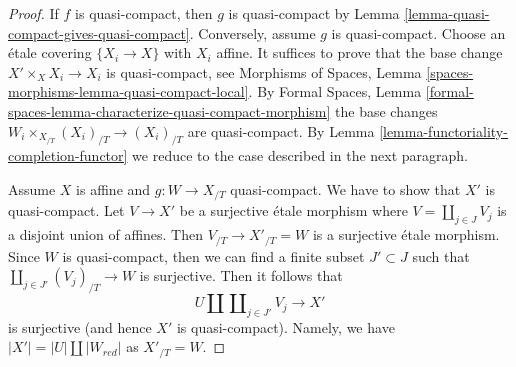\documentclass[10pt,a4paper]{amsart}
\theoremstyle{plain}
\theoremstyle{definition}
\theoremstyle{remark}
\numberwithin{equation}{subsection}
\begin{document}
\begin{proof}
If $f$ is quasi-compact, then $g$ is quasi-compact by
Lemma \ref{lemma-quasi-compact-gives-quasi-compact}.
Conversely, assume $g$ is quasi-compact.
Choose an \'etale covering $\{X_i \to X\}$ with $X_i$ affine.
It suffices to prove that the base change $X' \times_X X_i \to X_i$
is quasi-compact, see
Morphisms of Spaces, Lemma \ref{spaces-morphisms-lemma-quasi-compact-local}.
By Formal Spaces, Lemma
\ref{formal-spaces-lemma-characterize-quasi-compact-morphism}
the base changes $W_i \times_{X_{/T}} (X_i)_{/T}  \to (X_i)_{/T}$
are quasi-compact.
By Lemma \ref{lemma-functoriality-completion-functor}
we reduce to the case described in the next paragraph.

\medskip\noindent
Assume $X$ is affine and $g : W \to X_{/T}$ quasi-compact.
We have to show that $X'$ is quasi-compact.
Let $V \to X'$ be a surjective \'etale morphism
where $V = \coprod_{j \in J} V_j$ is a disjoint union of affines. Then
$V_{/T} \to X'_{/T} = W$ is a surjective \'etale morphism.
Since $W$ is quasi-compact, then we can find a finite subset
$J' \subset J$ such that $\coprod_{j \in J'} (V_j)_{/T} \to W$ is surjective.
Then it follows that
$$
U \amalg \coprod\nolimits_{j \in J'} V_j \longrightarrow X'
$$
is surjective (and hence $X'$ is quasi-compact).
Namely, we have $|X'| = |U| \amalg |W_{red}|$ as $X'_{/T} = W$.
\end{proof}
\end{document}

